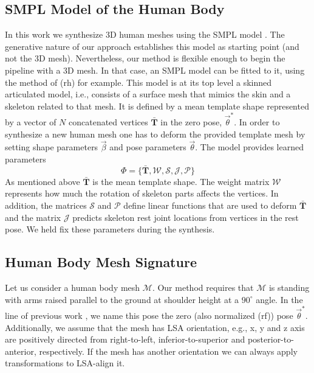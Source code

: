 \documentclass[runningheads]{llncs}
\begin{document}
\subsection{SMPL Model of the Human Body}\label{subsec:smpl_model}
In this work we synthesize 3D human meshes using the SMPL
model \cite{Loper.2015}. The generative nature of our approach establishes this 
model as starting point (and not the 3D mesh). Nevertheless, our method is 
flexible enough to begin the pipeline with a 3D mesh. In that case, an SMPL 
model can be fitted to it, using the method of (rh) for example.
This model is at its top level a skinned articulated 
model, i.e., 
consists of a 
surface mesh that mimics the skin and a skeleton related to that mesh. It is 
defined by a mean 
template shape represented by a vector of $N$ concatenated vertices 
$\mathbf{\bar{T}}$ in the zero pose, $\vec{\theta}^*$. In order 
to 
synthesize a 
new human mesh one has to deform the provided template mesh by 
setting shape parameters $\vec{\beta}$ and pose parameters $\vec{\theta}$. The 
model provides learned parameters
\begin{equation} \label{eq:smpl_params}
\Phi = \{\mathbf{\bar{T}}, \mathcal{W}, \mathcal{S}, \mathcal{J}, 
\mathcal{P}\}
\end{equation}
As mentioned above $\mathbf{\bar{T}}$ is the mean template shape. The weight 
matrix $\mathcal{W}$ represents how much the rotation of skeleton parts affects 
the vertices. In addition, the matrices $\mathcal{S}$ and $\mathcal{P}$ define 
linear functions that are used to deform $\mathbf{\bar{T}}$ and the matrix 
$\mathcal{J}$ predicts skeleton rest joint locations from vertices in the rest 
pose. We held fix these parameters during the synthesis.

\subsection{Human Body Mesh Signature}\label{subsec:hbm_signature}
Let us consider a human body mesh $\mathcal{M}$. Our method requires that 
$\mathcal{M}$ is standing with arms raised 
parallel to the 
ground at shoulder height at a $90^\circ$ angle. In the line 
of previous work \cite{Dibra.2016a}, we name this pose the zero (also 
normalized (rf)) pose $\vec{\theta}^*$. Additionally, we assume that the mesh 
has LSA orientation, e.g., x, y and z axis are positively directed from 
right-to-left, inferior-to-superior and posterior-to-anterior, respectively. If 
the mesh has another orientation we can always apply transformations to 
LSA-align it.
\end{document}
